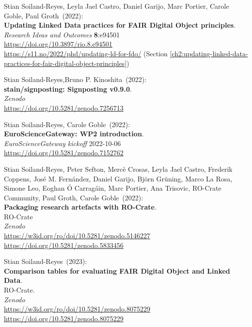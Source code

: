 \begin{thebibliography}{9}
Stian Soiland-Reyes, Leyla Jael Castro, Daniel Garijo, Marc Portier, Carole Goble, Paul Groth~(2022): \\
\textbf{Updating Linked Data practices for FAIR Digital Object principles}. \\
\emph{Research Ideas and Outcomes} \textbf{8}:e94501 \\
\url{https://doi.org/10.3897/rio.8.e94501}\\
\url{https://s11.no/2022/phd/updating-ld-for-fdo/} (Section \vref{ch2:updating-linked-data-practices-for-fair-digital-object-principles})

Stian Soiland-Reyes,Bruno P. Kinoshita~(2022): \\
\textbf{stain/signposting: Signposting v0.9.0}.\\
\emph{Zenodo}\\
\url{https://doi.org/10.5281/zenodo.7256713}

Stian Soiland-Reyes, Carole Goble~(2022): \\
\textbf{EuroScienceGateway: WP2 introduction}.\\
\emph{EuroScienceGateway kickoff} 2022-10-06\\
\url{https://doi.org/10.5281/zenodo.7152762}

Stian Soiland-Reyes, Peter Sefton, Mercè Crosas, Leyla Jael Castro, Frederik Coppens, José M. Fernández, Daniel Garijo, Björn Grüning, Marco La Rosa, Simone Leo, Eoghan Ó Carragáin, Marc Portier, Ana Trisovic, RO-Crate Community, Paul Groth, Carole Goble~(2022): \\
\textbf{Packaging research artefacts with RO-Crate}. \\
RO-Crate\\
\emph{Zenodo}\\
\url{https://w3id.org/ro/doi/10.5281/zenodo.5146227} \\
\url{https://doi.org/10.5281/zenodo.5833456}

Stian Soiland-Reyes~(2023): \\
\textbf{Comparison tables for evaluating FAIR Digital Object and Linked Data}.\\
RO-Crate. \\
\emph{Zenodo}\\
\url{https://w3id.org/ro/doi/10.5281/zenodo.8075229}\\
\url{https://doi.org/10.5281/zenodo.8075229}


\end{thebibliography}
